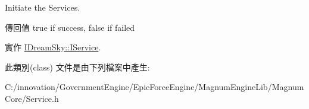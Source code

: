 Initiate the Services. 

\begin{DoxyReturn}{傳回值}
true if success, false if failed 
\end{DoxyReturn}


實作 \hyperlink{class_i_dream_sky_1_1_i_service_ac409218db5b5c15a585dbff362cfe628}{I\+Dream\+Sky\+::\+I\+Service}.



此類別(class) 文件是由下列檔案中產生\+:\begin{DoxyCompactItemize}
\item 
C\+:/innovation/\+Government\+Engine/\+Epic\+Force\+Engine/\+Magnum\+Engine\+Lib/\+Magnum\+Core/Service.\+h\end{DoxyCompactItemize}
